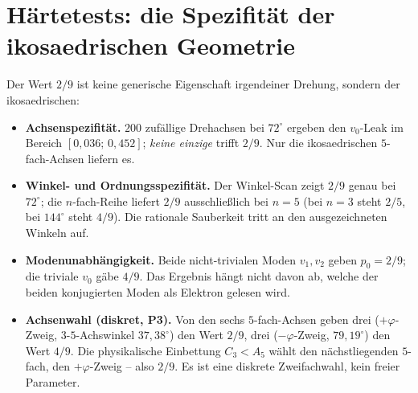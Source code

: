 \section{Härtetests: die Spezifität der ikosaedrischen Geometrie}
Der Wert $2/9$ ist keine generische Eigenschaft irgendeiner Drehung, sondern der ikosaedrischen:
\begin{itemize}
\item \textbf{Achsenspezifität.} $200$ zufällige Drehachsen bei $72^\circ$ ergeben den
$v_0$-Leak im Bereich $[0{,}036;\,0{,}452]$; \emph{keine einzige} trifft $2/9$. Nur die
ikosaedrischen $5$-fach-Achsen liefern es.
\item \textbf{Winkel- und Ordnungsspezifität.} Der Winkel-Scan zeigt $2/9$ genau bei $72^\circ$;
die $n$-fach-Reihe liefert $2/9$ ausschließlich bei $n=5$ (bei $n=3$ steht $2/5$, bei $144^\circ$
steht $4/9$). Die rationale Sauberkeit tritt an den ausgezeichneten Winkeln auf.
\item \textbf{Modenunabhängigkeit.} Beide nicht-trivialen Moden $v_1,v_2$ geben $p_0=2/9$; die
triviale $v_0$ gäbe $4/9$. Das Ergebnis hängt nicht davon ab, welche der beiden konjugierten
Moden als Elektron gelesen wird.
\item \textbf{Achsenwahl (diskret, P3).} Von den sechs $5$-fach-Achsen geben drei ($+\varphi$-Zweig,
$3$-$5$-Achswinkel $37{,}38^\circ$) den Wert $2/9$, drei ($-\varphi$-Zweig, $79{,}19^\circ$) den
Wert $4/9$. Die physikalische Einbettung $C_3<A_5$ wählt den nächstliegenden $5$-fach, den
$+\varphi$-Zweig -- also $2/9$. Es ist eine diskrete Zweifachwahl, kein freier Parameter.
\end{itemize}

